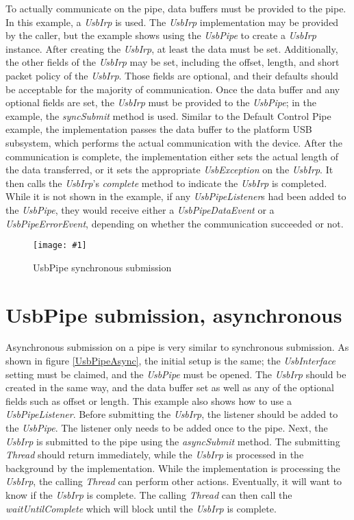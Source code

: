 \documentclass{article}
\newcommand{\myclass}[1]{\emph{#1}}
\newcommand{\myinterface}[1]{\emph{#1}}
\newcommand{\mymethod}[1]{\emph{#1}}
\newcommand{\myfigure}[3]{\begin{figure}[htbp]\centering\texttt{[image: \#1]}\caption{#2}\label{#3}\end{figure}}
\begin{document}
To actually communicate on the pipe, data buffers must be provided to the pipe.
In this example, a \myinterface{UsbIrp} is used.  The \myinterface{UsbIrp} implementation may be provided
by the caller, but the example shows using the \myinterface{UsbPipe} to create a \myinterface{UsbIrp}
instance.  After creating the \myinterface{UsbIrp}, at least the data must be set.  Additionally,
the other fields of the \myinterface{UsbIrp} may be set, including the offset, length, and short
packet policy of the \myinterface{UsbIrp}.  Those fields are optional, and their defaults should
be acceptable for the majority of communication.  Once the data buffer and any
optional fields are set, the \myinterface{UsbIrp} must be provided to the \myinterface{UsbPipe}; in the example,
the \mymethod{syncSubmit} method is used.  Similar to the Default Control Pipe
example, the implementation passes the data buffer to the platform USB subsystem,
which performs the actual communication with the device.  After the communication
is complete, the implementation either sets the actual length of the data
transferred, or it sets the appropriate \myclass{UsbException} on the \myinterface{UsbIrp}.  It then
calls the \myinterface{UsbIrp}'s \mymethod{complete} method to indicate the \myinterface{UsbIrp} is completed.
While it is not shown in the example, if any \myinterface{UsbPipeListener}s had been added to
the \myinterface{UsbPipe}, they would receive either a \myclass{UsbPipeDataEvent} or a \myclass{UsbPipeErrorEvent},
depending on whether the communication succeeded or not.

\myfigure{figs/UsbPipeSync}{UsbPipe synchronous submission}{UsbPipeSync}


\section{UsbPipe submission, asynchronous}

Asynchronous submission on a pipe is very similar to synchronous submission.
As shown in figure \ref{UsbPipeAsync}, the initial setup is the same; the
\myinterface{UsbInterface} setting must be claimed, and the \myinterface{UsbPipe} must be opened.  The
\myinterface{UsbIrp} should be created in the same way, and the data buffer set as well
as any of the optional fields such as offset or length.  This example also
shows how to use a \myinterface{UsbPipeListener}.  Before submitting the \myinterface{UsbIrp}, the
listener should be added to the \myinterface{UsbPipe}.  The listener only needs to be added
once to the pipe.  Next, the \myinterface{UsbIrp} is submitted to the pipe using the
\mymethod{asyncSubmit} method.  The submitting \myclass{Thread} should return
immediately, while the \myinterface{UsbIrp} is processed in the background by the implementation.
While the implementation is processing the \myinterface{UsbIrp}, the calling \myclass{Thread} can perform
other actions.  Eventually, it will want to know if the \myinterface{UsbIrp} is complete.  The
calling \myclass{Thread} can then call the \mymethod{waitUntilComplete} which will block
until the \myinterface{UsbIrp} is complete.  
\end{document}
